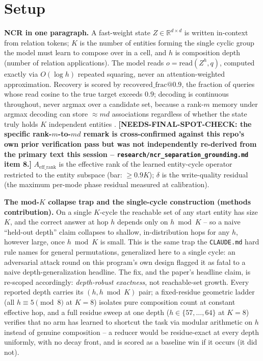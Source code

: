 \section{Setup}
\label{sec:background}

\textbf{NCR in one paragraph.} A fast-weight state $Z \in
\mathbb{R}^{d\times d}$ is written in-context from relation tokens; $K$ is
the number of entities forming the single cyclic group the model must
learn to compose over in a cell, and $h$ is composition depth (number of
relation applications). The model reads $o = \mathrm{read}(Z^h, q)$,
computed exactly via $O(\log h)$ repeated squaring, never an
attention-weighted approximation. Recovery is scored by
$\mathrm{recovered\_frac@0.9}$, the fraction of queries whose read cosine
to the true target exceeds $0.9$; decoding is continuous throughout, never
argmax over a candidate set, because a rank-$m$ memory under argmax
decoding can store $\approx md$ associations regardless of whether the
state truly holds $K$ independent entities
\citep{nichani2025understanding}. \textbf{[NEEDS-FINAL-SPOT-CHECK: the
specific rank-$m$-to-$md$ remark is cross-confirmed against this repo's
own prior verification pass but was not independently re-derived from the
primary text this session --
\texttt{research/ncr\_separation\_grounding.md} item 8.]}
$A_{\mathrm{eff\_rank}}$ is the effective rank of the learned entity-cycle
operator restricted to the entity subspace (bar: $\geq 0.9K$); $\delta$ is
the write-quality residual (the maximum per-mode phase residual measured
at calibration).

\textbf{The mod-$K$ collapse trap and the single-cycle construction
(methods contribution).} On a single $K$-cycle the reachable set of any
start entity has size $K$, and the correct answer at hop $h$ depends only
on $h \bmod K$ -- so a naive ``held-out depth'' claim collapses to shallow,
in-distribution hops for any $h$, however large, once $h \bmod K$ is small.
This is the same trap the \texttt{CLAUDE.md} hard rule names for general
permutations, generalized here to a single cycle: an adversarial attack
round on this program's own design flagged it as fatal to a naive
depth-generalization headline. %
The fix, and the paper's headline claim, is re-scoped accordingly:
\emph{depth-robust exactness}, not reachable-set growth. Every reported
depth carries its $(h, h \bmod K)$ pair; a fixed-residue geometric ladder
(all $h \equiv 5 \pmod 8$ at $K{=}8$) isolates pure composition count at
constant effective hop, and a full residue sweep at one depth
($h \in \{57,\dots,64\}$ at $K{=}8$) verifies that no arm has learned to
shortcut the task via modular arithmetic on $h$ instead of genuine
composition -- a reducer would be residue-exact at every depth uniformly,
with no decay front, and is scored as a baseline win if it occurs (it did
not). %

